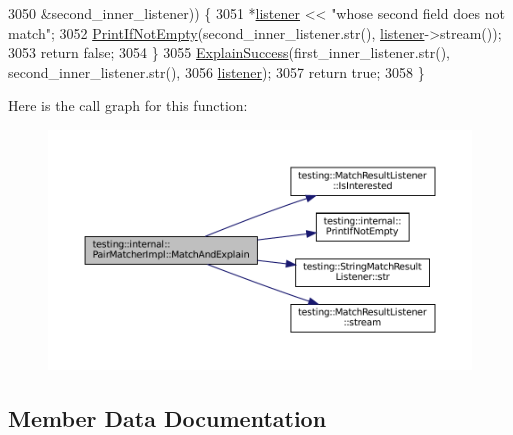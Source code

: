 \begin{DoxyCode}
3050                                          &second\_inner\_listener)) \{
3051       *\hyperlink{namespaceinteractive__marker_a0e579ab555212bb5e2c9f8a675b7618a}{listener} << \textcolor{stringliteral}{"whose second field does not match"};
3052       \hyperlink{namespacetesting_1_1internal_afa4cd5d7933878d6d820b32c87bb2767}{PrintIfNotEmpty}(second\_inner\_listener.str(), \hyperlink{namespaceinteractive__marker_a0e579ab555212bb5e2c9f8a675b7618a}{listener}->stream());
3053       \textcolor{keywordflow}{return} \textcolor{keyword}{false};
3054     \}
3055     \hyperlink{classtesting_1_1internal_1_1PairMatcherImpl_ae73fee9c00b8be4b596ad13b8b6eaa09}{ExplainSuccess}(first\_inner\_listener.str(), second\_inner\_listener.str(),
3056                    \hyperlink{namespaceinteractive__marker_a0e579ab555212bb5e2c9f8a675b7618a}{listener});
3057     \textcolor{keywordflow}{return} \textcolor{keyword}{true};
3058   \}
\end{DoxyCode}
Here is the call graph for this function\+:
\nopagebreak
\begin{figure}[H]
\begin{center}
\leavevmode
\includegraphics[width=350pt]{classtesting_1_1internal_1_1PairMatcherImpl_a1bba47f97cbf50a1f6331d3f7bfd47a1_cgraph}
\end{center}
\end{figure}


\subsection{Member Data Documentation}
\mbox{\label{classtesting_1_1internal_1_1PairMatcherImpl_a70e5a952ffd16886f5f1bacc718561f8}} 
